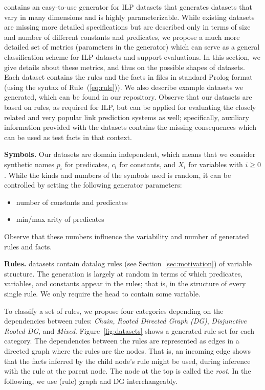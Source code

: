 \documentclass[letterpaper]{article} \usepackage{aaai20}  \usepackage{times}  \usepackage{helvet} \usepackage{courier}  \usepackage[hyphens]{url}  \usepackage{graphicx} \urlstyle{rm} \def\UrlFont{\rm}  \usepackage{graphicx}  \frenchspacing  \setlength{\pdfpagewidth}{8.5in}  \setlength{\pdfpageheight}{11in}  \usepackage{amsthm}
\theoremstyle{definition}
\newcommand{\tool}{\text{RuDaS}\xspace}
\begin{document}
\tool contains an easy-to-use generator for ILP datasets that generates datasets that vary in many dimensions and is highly parameterizable. While existing datasets are missing more detailed specifications but are described only in terms of size and number of different constants and predicates, we propose a much more detailed set of metrics (parameters in the generator) which can serve as a general classification scheme for ILP datasets and support evaluations.
In this section, we give details about these metrics, and thus on the possible shapes of \tool datasets. 
Each dataset contains the rules and the facts in files in standard Prolog format (using the syntax of Rule~(\ref{eq:rule})). We also describe example datasets we generated, which can be found in our repository. 
Observe that our datasets are based on rules, as required for ILP, but can be applied for evaluating the closely related and very popular link prediction systems as well;  specifically, auxiliary information provided with the datasets contains the missing consequences which can be used as test facts in that context.



\textbf{Symbols.} 
Our datasets are domain independent, which means that we consider synthetic names $p_i$ for {predicates}, $c_i$ for {constants}, and $X_i$ for {variables} with $i\ge0$. While the kinds and numbers of the symbols used is random, it can be controlled by setting the following generator parameters:
\begin{itemize}
\item number of constants and predicates
\item min/max arity of predicates
\end{itemize}
Observe that these numbers influence the variability and number of generated rules and facts.








\textbf{Rules.} 
\tool datasets contain datalog {rules} (see Section~\ref{sec:motivation}) of variable structure. The generation is largely at random in terms of which predicates, variables, and constants appear in the rules; that is, in the structure of every single rule. We only require the head to contain some variable.


To classify a set of rules, we propose four categories depending on the dependencies between rules: \emph{Chain}, \emph{Rooted Directed Graph (DG)}, \emph{Disjunctive Rooted DG}, and \emph{Mixed}. 
Figure~\ref{fig:datasets} shows a generated rule set for each category. 
The dependencies between the rules are represented as edges in a directed graph where the rules are the nodes. That is, an incoming edge shows that the facts inferred by the child node's rule might be used, during inference with the rule at the parent node.
The node at the top
is called the \emph{root}. In the following, we use (rule) graph and DG interchangeably. 
\end{document}
